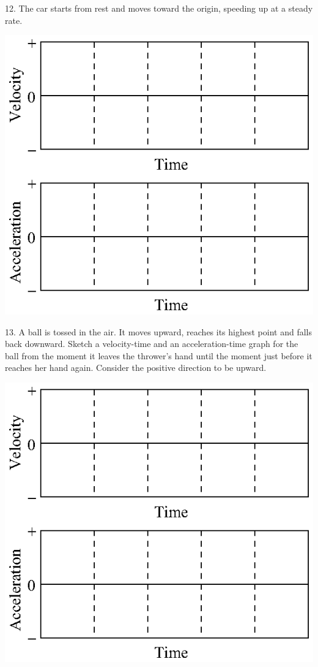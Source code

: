 12. The car starts from rest and moves toward the origin, speeding up at a steady
rate.

\vspace{0.3cm}
{\par\centering \includegraphics{slowing/slowing_fig15.eps} \par}
\vspace{0.3cm}

13. A ball is tossed in the air. It moves upward, reaches its highest point
and falls back downward. Sketch a velocity-time and an acceleration-time graph
for the ball from the moment it leaves the thrower's hand until the moment just
before it reaches her hand again. Consider the positive direction to be upward.

\vspace{0.3cm}
{\par\centering \includegraphics{slowing/slowing_fig15.eps} \par}
\vspace{0.3cm}


